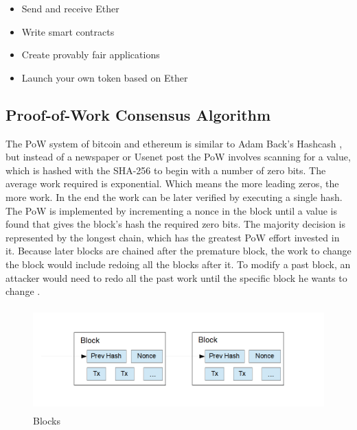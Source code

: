 \begin{itemize}
	\item Send and receive Ether
	\item Write smart contracts
	\item Create provably fair applications
	\item Launch your own token based on Ether
\end{itemize}


\clearpage

\subsection{Proof-of-Work Consensus Algorithm}
\label{subsec:background:first_section:second_subsection}


The \ac{PoW} system of bitcoin and ethereum is similar to Adam Back's Hashcash \cite{back2002hashcash}, but instead of a newspaper or Usenet post the \ac{PoW} involves scanning for a value, which is hashed with the \ac{SHA-256} to begin with a number of zero bits. The average work required is exponential. Which means the more leading zeros, the more work. In the end the work can be later verified by executing a single hash. The \ac{PoW} is implemented by incrementing a nonce in the block until a value is found that gives the block's hash the required zero bits. The majority decision is represented by the longest chain, which has the greatest \ac{PoW} effort invested in it. Because later blocks are chained after the premature block, the work to change the block would include redoing all the blocks after it. To modify a past block, an attacker would need to redo all the past work until the specific block he wants to change \cite{nakamoto2008peer}. 

\begin{figure}[h]
	\includegraphics[height=4cm]{blocks}
	\caption{Blocks}
	\label{fig:blocks}
\end{figure}

